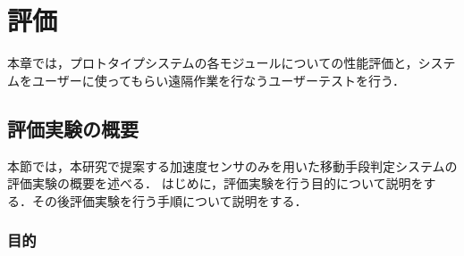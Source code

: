 \chapter{評価}
本章では，プロトタイプシステムの各モジュールについての性能評価と，システムをユーザーに使ってもらい遠隔作業を行なうユーザーテストを行う．

\section{評価実験の概要}
本節では，本研究で提案する加速度センサのみを用いた移動手段判定システムの評価実験の概要を述べる．
はじめに，評価実験を行う目的について説明をする．その後評価実験を行う手順について説明をする．

\subsection{目的}


